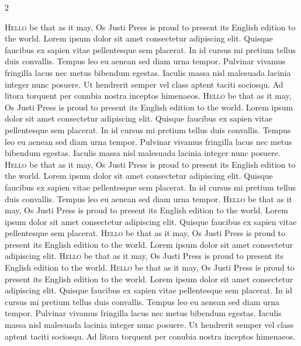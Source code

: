 \documentclass[openany]{book}
\begin{document}
\begin{multicols}{2}

\lettrine[lines=2]{H}{ello} be that as it may, Os Justi Press is proud to present its English edition to the world. Lorem ipsum dolor sit amet consectetur adipiscing elit. Quisque faucibus ex sapien vitae pellentesque sem placerat. In id cursus mi pretium tellus duis convallis. Tempus leo eu aenean sed diam urna tempor. Pulvinar vivamus fringilla lacus nec metus bibendum egestas. Iaculis massa nisl malesuada lacinia integer nunc posuere. Ut hendrerit semper vel class aptent taciti sociosqu. Ad litora torquent per conubia nostra inceptos himenaeos.
\lettrine[lines=2]{H}{ello} be that as it may, Os Justi Press is proud to present its English edition to the world. Lorem ipsum dolor sit amet consectetur adipiscing elit. Quisque faucibus ex sapien vitae pellentesque sem placerat. In id cursus mi pretium tellus duis convallis. Tempus leo eu aenean sed diam urna tempor. Pulvinar vivamus fringilla lacus nec metus bibendum egestas. Iaculis massa nisl malesuada lacinia integer nunc posuere.
\lettrine[lines=2]{H}{ello} be that as it may, Os Justi Press is proud to present its English edition to the world. Lorem ipsum dolor sit amet consectetur adipiscing elit. Quisque faucibus ex sapien vitae pellentesque sem placerat. In id cursus mi pretium tellus duis convallis. Tempus leo eu aenean sed diam urna tempor.
\lettrine[lines=2]{H}{ello} be that as it may, Os Justi Press is proud to present its English edition to the world. Lorem ipsum dolor sit amet consectetur adipiscing elit. Quisque faucibus ex sapien vitae pellentesque sem placerat.
\lettrine[lines=2]{H}{ello} be that as it may, Os Justi Press is proud to present its English edition to the world. Lorem ipsum dolor sit amet consectetur adipiscing elit.
\lettrine[lines=2]{H}{ello} be that as it may, Os Justi Press is proud to present its English edition to the world.
\lettrine[lines=2]{H}{ello} be that as it may, Os Justi Press is proud to present its English edition to the world. Lorem ipsum dolor sit amet consectetur adipiscing elit. Quisque faucibus ex sapien vitae pellentesque sem placerat. In id cursus mi pretium tellus duis convallis. Tempus leo eu aenean sed diam urna tempor. Pulvinar vivamus fringilla lacus nec metus bibendum egestas. Iaculis massa nisl malesuada lacinia integer nunc posuere. Ut hendrerit semper vel class aptent taciti sociosqu. Ad litora torquent per conubia nostra inceptos himenaeos.

\end{multicols}
\end{document}
